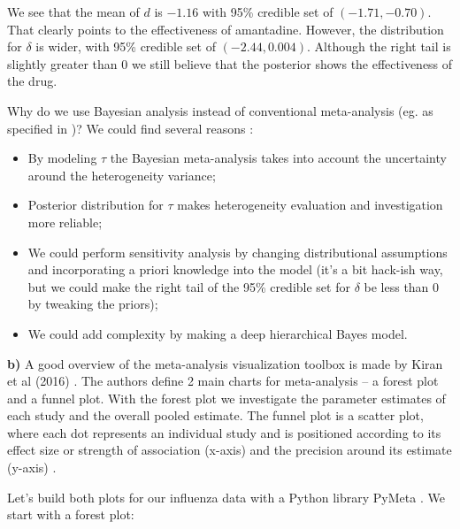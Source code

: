 \documentclass[a4 paper]{article}
\begin{document}
We see that the mean of $d$ is $-1.16$
with 95\% credible set of $(-1.71, -0.70)$.
That clearly points to the effectiveness 
of amantadine. However, the distribution 
for $\delta$ is wider, with 95\% credible set
of $(-2.44, 0.004)$. Although the right 
tail is slightly greater than $0$ we still 
believe that the posterior shows the 
effectiveness of the drug.

Why do we use Bayesian analysis instead
of conventional meta-analysis 
(eg. as specified in \cite{col})?
We could find several reasons \cite{bma}:

\begin{itemize}
\item By modeling $\tau$ the Bayesian meta-analysis 
takes into account the uncertainty
around the heterogeneity variance;

\item Posterior distribution for $\tau$ makes heterogeneity 
evaluation
and investigation more reliable;

\item We could perform sensitivity analysis by changing
distributional assumptions and incorporating 
a priori knowledge into the model (it's a bit hack-ish way,
but we could make the right tail of the 95\% 
credible set for $\delta$ be less than $0$ by 
tweaking the priors);

\item We could add complexity by 
making a deep hierarchical Bayes model.
\end{itemize} 




\textbf{b)} A good overview of the 
meta-analysis visualization toolbox
is made by Kiran et al (2016) \cite{card}.
The authors define 2 main charts for 
meta-analysis -- a forest plot
and a funnel plot.
With the forest plot we investigate the parameter 
estimates of each study and the overall pooled
estimate. 
The funnel plot is a scatter plot, where each dot represents an
individual study and is positioned according to its effect size or
strength of association (x-axis) and the precision around its estimate (y-axis) \cite{card}.

Let's build both plots for our influenza 
data with a Python library
PyMeta \cite{pymeta}. We start with a forest plot:
\end{document}
